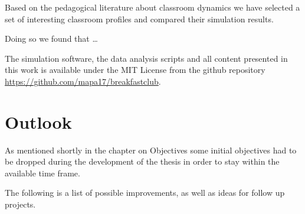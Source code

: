 Based on the pedagogical literature about classroom dynamics we have selected a
set of interesting classroom profiles and compared their simulation results.

Doing so we found that \dots

The simulation software, the data analysis scripts and all content presented in this
work is available under the MIT License from the github repository \href{https://github.com/mapa17/breakfastclub}{https://github.com/mapa17/breakfastclub}.



\section{Outlook}
As mentioned shortly in the chapter on Objectives some initial objectives had to
be dropped during the development of the thesis in order to stay within the available
time frame.

The following is a list of possible improvements, as well as ideas for follow up projects.

